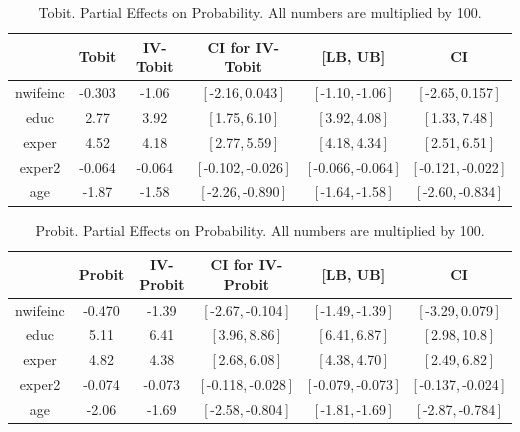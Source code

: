 \documentclass[12pt]{article}
\begin{document}
\begin{table}[!h]
  \begin{center}
  \begin{tabular}{|c|c|cc|cc|}
    \hline\hline
   &  Tobit & IV-Tobit & CI for IV-Tobit & [LB, UB] & CI \\ \hline
    nwifeinc &  -0.303 & -1.06 & [\,-2.16,\,0.043\,] & [\,-1.10,\,-1.06\,] & [\,-2.65,\,0.157\,]\\ 
    educ &  2.77 & 3.92 & [\,1.75,\,6.10\,] & [\,3.92,\,4.08\,] & [\,1.33,\,7.48\,]\\ 
    exper &  4.52 & 4.18 & [\,2.77,\,5.59\,] & [\,4.18,\,4.34\,] & [\,2.51,\,6.51\,]\\ 
    exper2 &  -0.064 & -0.064 & [\,-0.102,\,-0.026\,] & [\,-0.066,\,-0.064\,] & [\,-0.121,\,-0.022\,]\\ 
    age &  -1.87 & -1.58 & [\,-2.26,\,-0.890\,] & [\,-1.64,\,-1.58\,] & [\,-2.60,\,-0.834\,]\\ 
  \hline\hline
  \end{tabular}
  \caption{Tobit. Partial Effects on Probability. All numbers are multiplied by 100.}
  \label{table:Emp-Tobit-PEM-P-w-CI}
  \end{center}
\end{table}

\begin{table}[!h]
  \begin{center}
  \begin{tabular}{|c|c|cc|cc|}
    \hline\hline
   &  Probit & IV-Probit & CI for IV-Probit & [LB, UB] & CI \\ \hline
    nwifeinc &  -0.470 & -1.39 & [\,-2.67,\,-0.104\,] & [\,-1.49,\,-1.39\,] & [\,-3.29,\,0.079\,]\\ 
    educ &  5.11 & 6.41 & [\,3.96,\,8.86\,] & [\,6.41,\,6.87\,] & [\,2.98,\,10.8\,]\\ 
    exper &  4.82 & 4.38 & [\,2.68,\,6.08\,] & [\,4.38,\,4.70\,] & [\,2.49,\,6.82\,]\\ 
    exper2 &  -0.074 & -0.073 & [\,-0.118,\,-0.028\,] & [\,-0.079,\,-0.073\,] & [\,-0.137,\,-0.024\,]\\ 
    age &  -2.06 & -1.69 & [\,-2.58,\,-0.804\,] & [\,-1.81,\,-1.69\,] & [\,-2.87,\,-0.784\,]\\ 
  \hline\hline
  \end{tabular}
  \caption{Probit. Partial Effects on Probability. All numbers are multiplied by 100.}
  \label{table:Emp-Probit-PEM-P-w-CI}
  \end{center}
\end{table}
\end{document}
